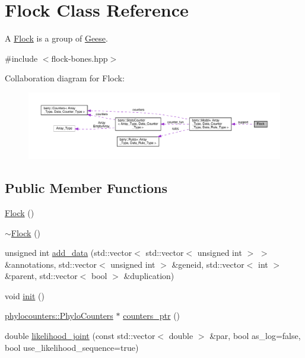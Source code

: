 \hypertarget{class_flock}{}\section{Flock Class Reference}
\label{class_flock}


A \hyperlink{class_flock}{Flock} is a group of \hyperlink{class_geese}{Geese}.  




{\ttfamily \#include $<$flock-\/bones.\+hpp$>$}



Collaboration diagram for Flock\+:
\nopagebreak
\begin{figure}[H]
\begin{center}
\leavevmode
\includegraphics[width=350pt]{class_flock__coll__graph}
\end{center}
\end{figure}
\subsection*{Public Member Functions}
\begin{DoxyCompactItemize}
\item 
\hyperlink{class_flock_a2a0a514c368e21f718ad7358ed42f3b7}{Flock} ()
\item 
\hyperlink{class_flock_ab5ed0567a8721dd114763267f9fa3bdf}{$\sim$\+Flock} ()
\item 
unsigned int \hyperlink{class_flock_a17f2726d36ca5727b14c71d1e1dbabe9}{add\+\_\+data} (std\+::vector$<$ std\+::vector$<$ unsigned int $>$ $>$ \&annotations, std\+::vector$<$ unsigned int $>$ \&geneid, std\+::vector$<$ int $>$ \&parent, std\+::vector$<$ bool $>$ \&duplication)
\item 
void \hyperlink{class_flock_a99f3c0a3aacc8af28c13207dd81d7164}{init} ()
\item 
\hyperlink{namespacebarry_1_1counters_1_1phylo_a4e401ffe66d04091343dcffaf915f8c3}{phylocounters\+::\+Phylo\+Counters} $\ast$ \hyperlink{class_flock_a1e7aec0dc05f41da6f0caa80a202daa0}{counters\+\_\+ptr} ()
\item 
double \hyperlink{class_flock_a701dce27fdc0a20e63caec1e1fd3def7}{likelihood\+\_\+joint} (const std\+::vector$<$ double $>$ \&par, bool as\+\_\+log=false, bool use\+\_\+likelihood\+\_\+sequence=true)
\end{DoxyCompactItemize}
